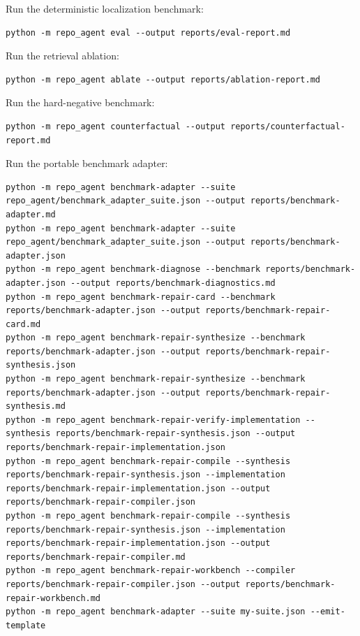 \documentclass[UTF8,12pt,openany]{ctexbook}
\begin{document}
Run the deterministic localization benchmark:\par

\begin{lstlisting}
python -m repo_agent eval --output reports/eval-report.md
\end{lstlisting}

Run the retrieval ablation:\par

\begin{lstlisting}
python -m repo_agent ablate --output reports/ablation-report.md
\end{lstlisting}

Run the hard-negative benchmark:\par

\begin{lstlisting}
python -m repo_agent counterfactual --output reports/counterfactual-report.md
\end{lstlisting}

Run the portable benchmark adapter:\par

\begin{lstlisting}
python -m repo_agent benchmark-adapter --suite repo_agent/benchmark_adapter_suite.json --output reports/benchmark-adapter.md
python -m repo_agent benchmark-adapter --suite repo_agent/benchmark_adapter_suite.json --output reports/benchmark-adapter.json
python -m repo_agent benchmark-diagnose --benchmark reports/benchmark-adapter.json --output reports/benchmark-diagnostics.md
python -m repo_agent benchmark-repair-card --benchmark reports/benchmark-adapter.json --output reports/benchmark-repair-card.md
python -m repo_agent benchmark-repair-synthesize --benchmark reports/benchmark-adapter.json --output reports/benchmark-repair-synthesis.json
python -m repo_agent benchmark-repair-synthesize --benchmark reports/benchmark-adapter.json --output reports/benchmark-repair-synthesis.md
python -m repo_agent benchmark-repair-verify-implementation --synthesis reports/benchmark-repair-synthesis.json --output reports/benchmark-repair-implementation.json
python -m repo_agent benchmark-repair-compile --synthesis reports/benchmark-repair-synthesis.json --implementation reports/benchmark-repair-implementation.json --output reports/benchmark-repair-compiler.json
python -m repo_agent benchmark-repair-compile --synthesis reports/benchmark-repair-synthesis.json --implementation reports/benchmark-repair-implementation.json --output reports/benchmark-repair-compiler.md
python -m repo_agent benchmark-repair-workbench --compiler reports/benchmark-repair-compiler.json --output reports/benchmark-repair-workbench.md
python -m repo_agent benchmark-adapter --suite my-suite.json --emit-template
\end{lstlisting}
\end{document}
